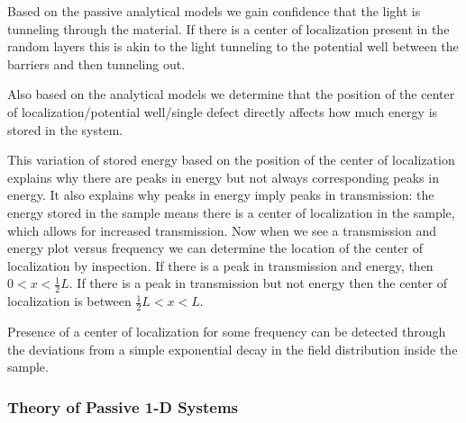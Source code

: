 Based on the passive analytical models we gain confidence that the light is tunneling through the material.  If there is a center of localization present in the random layers this is akin to the light tunneling to the potential well between the barriers and then tunneling out.

Also based on the analytical models we determine that the position of the center of localization/potential well/single defect directly affects how much energy is stored in the system.

This variation of stored energy based on the position of
the center of localization explains why there are peaks
in energy but not always corresponding peaks in energy.
It also explains why peaks in energy imply peaks 
in transmission: the energy stored in the sample
means there is a center of localization in the sample, which
allows for increased transmission.  Now when we see a transmission and
energy plot versus frequency we can determine the location
of the center of localization by inspection.  If there is
a peak in transmission and energy,
then $ 0 < x < \frac{1}{2} L $.  If there is a peak
in transmission but not energy then the center of
localization is between $ \frac{1}{2} L < x < L $.

Presence of a center of localization for some frequency can be detected
through the deviations from a simple exponential 
decay in the field distribution inside the sample.

\subsubsection {Theory of Passive 1-D Systems}

